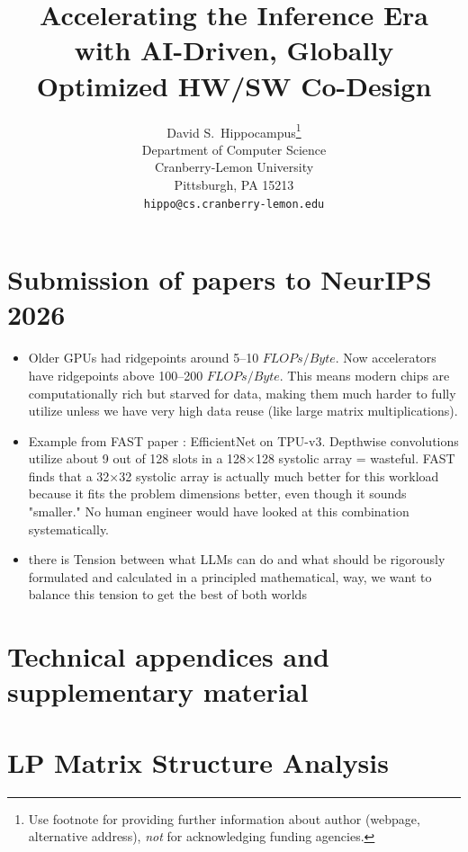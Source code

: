 \documentclass{article}
\title{Accelerating the Inference Era with AI-Driven, Globally Optimized HW/SW Co-Design}
\author{%
  David S.~Hippocampus\thanks{Use footnote for providing further information
    about author (webpage, alternative address), \emph{not} for acknowledging
    funding agencies.} \\
  Department of Computer Science\\
  Cranberry-Lemon University\\
  Pittsburgh, PA 15213 \\
  \texttt{hippo@cs.cranberry-lemon.edu} \\
}
\begin{document}
\maketitle


\begin{abstract}

\end{abstract}








\section{Submission of papers to NeurIPS 2026}



\begin{itemize}
    \item Older GPUs had ridgepoints around 5–10 $FLOPs/Byte$. Now accelerators have ridgepoints above 100–200 $FLOPs/Byte$. This means modern chips are computationally rich but starved for data, making them much harder to fully utilize unless we have very high data reuse (like large matrix multiplications).
    \item Example from FAST paper : EfficientNet on TPU-v3. Depthwise convolutions utilize about 9 out of 128 slots in a 128×128 systolic array = wasteful. FAST finds that a 32×32 systolic array is actually much better for this workload because it fits the problem dimensions better, even though it sounds "smaller." No human engineer would have looked at this combination systematically.
    \item there is Tension between what LLMs can do and what should be rigorously formulated and calculated in a principled mathematical, way, we want to balance this tension to get the best of both worlds

\end{itemize}



\appendix

\section{Technical appendices and supplementary material}


\section{LP Matrix Structure Analysis}
\end{document}
